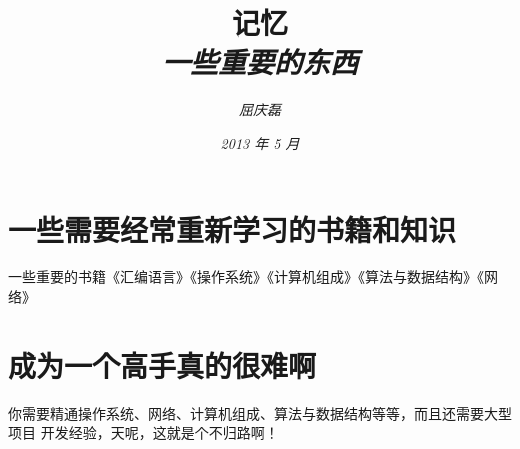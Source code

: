 \documentclass{article}
\begin{document}
\title{%
  {\huge \textsf{记忆}\\\smallskip}%
  {\small \textit{一些重要的东西}}
}

\author{\textit{屈庆磊}\\[2mm]
       }

\date{\textit{2013 年 5 月}}

\maketitle
\newpage
\begin{multicols}{2}
\tableofcontents
\end{multicols}
\newpage 

\section{一些需要经常重新学习的书籍和知识}
一些重要的书籍《汇编语言》《操作系统》《计算机组成》《算法与数据结构》《网络》

\section{成为一个高手真的很难啊}
你需要精通操作系统、网络、计算机组成、算法与数据结构等等，而且还需要大型项目
开发经验，天呢，这就是个不归路啊！
\end{document}
